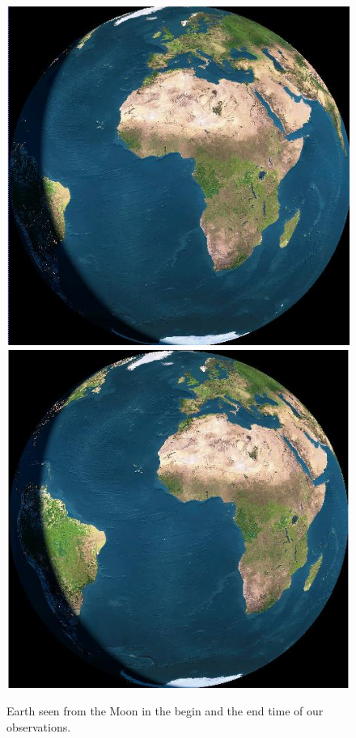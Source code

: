 \begin{figure}[htb]
\begin{center}
\includegraphics[scale=0.3]{figs/frommoon1.png}
\includegraphics[scale=0.3]{figs/frommoon2.png}
\caption{Earth seen from the Moon in the begin and the end time of our
observations.}
\label{frommoon}
\end{center}
\end{figure}


